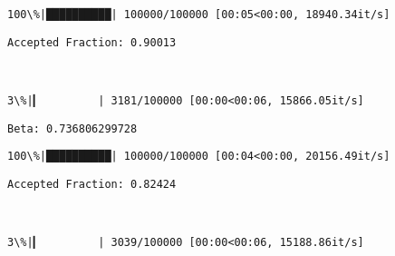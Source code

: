 \documentclass[11pt]{article}
\begin{document}
    \begin{Verbatim}[commandchars=\\\{\}]
100\%|██████████| 100000/100000 [00:05<00:00, 18940.34it/s]

    \end{Verbatim}

    \begin{Verbatim}[commandchars=\\\{\}]
Accepted Fraction: 0.90013

    \end{Verbatim}

    \begin{center}
    \end{center}
    { \hspace*{\fill} \\}
    
    \begin{Verbatim}[commandchars=\\\{\}]
  3\%|▎         | 3181/100000 [00:00<00:06, 15866.05it/s]
    \end{Verbatim}

    \begin{Verbatim}[commandchars=\\\{\}]
Beta: 0.736806299728

    \end{Verbatim}

    \begin{Verbatim}[commandchars=\\\{\}]
100\%|██████████| 100000/100000 [00:04<00:00, 20156.49it/s]

    \end{Verbatim}

    \begin{Verbatim}[commandchars=\\\{\}]
Accepted Fraction: 0.82424

    \end{Verbatim}

    \begin{center}
    \end{center}
    { \hspace*{\fill} \\}
    
    \begin{Verbatim}[commandchars=\\\{\}]
  3\%|▎         | 3039/100000 [00:00<00:06, 15188.86it/s]
    \end{Verbatim}
\end{document}
